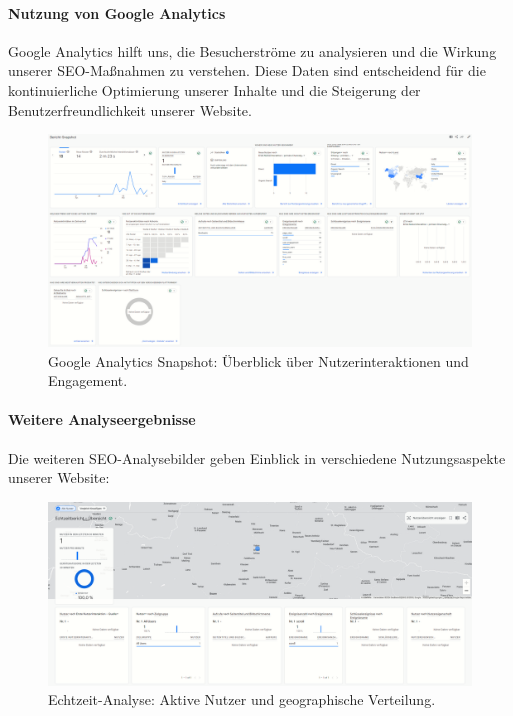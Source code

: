 \paragraph{Nutzung von Google Analytics}
Google Analytics hilft uns, die Besucherströme zu analysieren und die Wirkung unserer SEO-Maßnahmen zu verstehen. Diese Daten sind entscheidend für die kontinuierliche Optimierung unserer Inhalte und die Steigerung der Benutzerfreundlichkeit unserer Website.

\begin{figure}[h]
    \centering
    \includegraphics[width=\textwidth]{Resources/SEO_snapshot.png}
    \caption{Google Analytics Snapshot: Überblick über Nutzerinteraktionen und Engagement.}
\end{figure}

\newpage

\paragraph{Weitere Analyseergebnisse}
Die weiteren SEO-Analysebilder geben Einblick in verschiedene Nutzungsaspekte unserer Website:

\begin{figure}[h]
    \centering
    \includegraphics[width=\textwidth]{Resources/SEO_echtzeit.png}
    \caption{Echtzeit-Analyse: Aktive Nutzer und geographische Verteilung.}
\end{figure}

